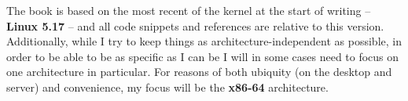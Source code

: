 The book is based on the most recent of the kernel at the start of writing --
\textbf{Linux 5.17} -- and all code snippets and references are relative to this
version. Additionally, while I try to keep things as architecture-independent as
possible, in order to be able to be as specific as I can be  I will in some cases
need to focus on one architecture in particular. For reasons of both ubiquity
(on the desktop and server) and convenience, my focus will be the
\textbf{x86-64} architecture.\\
